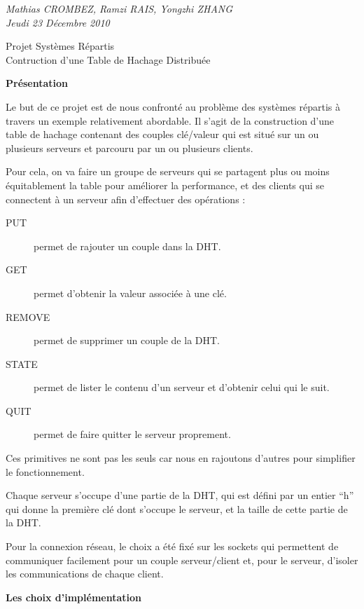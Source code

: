 \documentclass[a4paper,12pt]{article}
\begin{document}
\begin{flushleft} 
\normalsize{\itshape{Mathias CROMBEZ, Ramzi RAIS, Yongzhi ZHANG}}\\
\normalsize{\itshape{Jeudi 23 Décembre 2010}}\\
\end{flushleft} 
\begin{center}
\Large{Projet Systèmes Répartis}\\
\vspace{0.4cm}
\normalsize{Contruction d'une Table de Hachage Distribuée}\\
\end{center}

\large{\bf Présentation} \normalsize

Le but de ce projet est de nous confronté au problème des systèmes répartis à travers un exemple relativement abordable. Il s'agit de la construction d'une table de hachage contenant des couples clé/valeur qui est situé sur un ou plusieurs serveurs et parcouru par un ou plusieurs clients. 

Pour cela, on va faire un groupe de serveurs qui se partagent plus ou moins équitablement la table pour améliorer la performance, et des clients qui se connectent à un serveur afin d'effectuer des opérations :
\begin{description}
\item[PUT] permet de rajouter un couple dans la DHT.
\item[GET] permet d'obtenir la valeur associée à une clé.
\item[REMOVE] permet de supprimer un couple de la DHT.
\item[STATE] permet de lister le contenu d'un serveur et d'obtenir celui qui le suit.
\item[QUIT] permet de faire quitter le serveur proprement.
\end{description}

Ces primitives ne sont pas les seuls car nous en rajoutons d'autres pour simplifier le fonctionnement.

Chaque serveur s'occupe d'une partie de la DHT, qui est défini par un entier ``h'' qui donne la première clé dont s'occupe le serveur, et la taille de cette partie de la DHT.

Pour la connexion réseau, le choix a été fixé sur les sockets qui permettent de communiquer facilement pour un couple serveur/client et, pour le serveur, d'isoler les communications de chaque client.

\vspace{0.5cm}
\large{\bf Les choix d'implémentation} \normalsize
\end{document}

